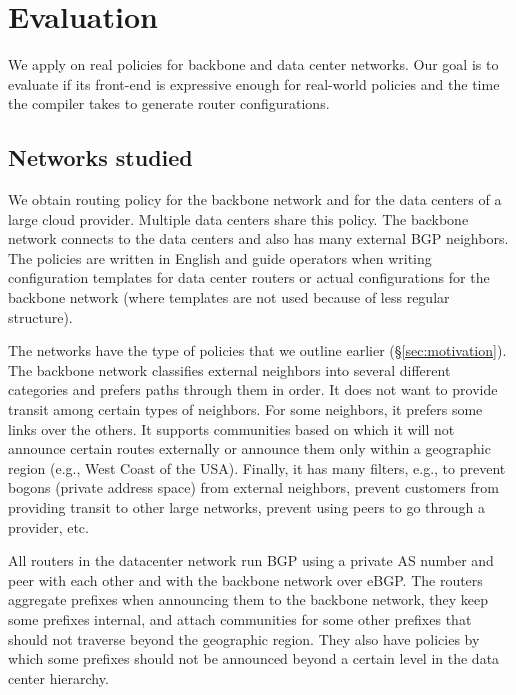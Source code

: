 \section{Evaluation}
\label{sec:evaluation}

We apply \sysname on real policies for backbone and data center networks. Our goal is to evaluate if its front-end is expressive enough for real-world policies and the time the compiler takes to generate router configurations.

\subsection{Networks studied}

We obtain routing policy for the backbone network and for the data centers of a large cloud provider. Multiple data centers share this policy. The backbone network connects to the data centers and also has many external BGP neighbors. The policies are written in English and guide operators when writing configuration templates for data center routers or actual configurations for the backbone network (where templates are not used because of less regular structure).

The networks have the type of policies that we outline earlier (\S\ref{sec:motivation}). The backbone network classifies external neighbors into several different categories and prefers paths through them in order. It does not want to provide transit among certain types of neighbors. For some neighbors, it prefers some links over the others. It supports communities based on which it will not announce certain routes externally or announce them only within a geographic region (e.g., West Coast of the USA). Finally, it has many filters, e.g., to prevent bogons (private address space) from external neighbors, prevent customers from providing transit to other large networks, prevent using peers to go through a provider, etc.

All routers in the datacenter network run BGP using a private AS number and peer with each other and with the backbone network over eBGP. The routers aggregate prefixes when announcing them to the backbone network, they keep some prefixes internal, and attach communities for some other prefixes that should not traverse beyond the geographic region. They also have policies by which some prefixes should not be announced beyond a certain level in the data center hierarchy.

